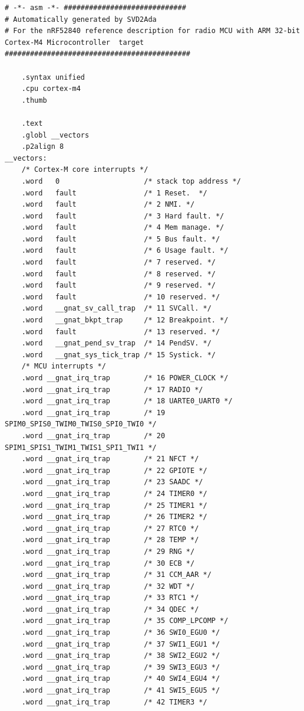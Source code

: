 \documentclass{article}
\begin{document}
\begin{lstlisting}
# -*- asm -*- #############################
# Automatically generated by SVD2Ada
# For the nRF52840 reference description for radio MCU with ARM 32-bit Cortex-M4 Microcontroller  target
############################################

	.syntax unified
	.cpu cortex-m4
	.thumb

	.text
	.globl __vectors
	.p2align 8
__vectors:
	/* Cortex-M core interrupts */
	.word   0                    /* stack top address */
	.word   fault                /* 1 Reset.  */
	.word   fault                /* 2 NMI. */
	.word   fault                /* 3 Hard fault. */
	.word   fault                /* 4 Mem manage. */
	.word   fault                /* 5 Bus fault. */
	.word   fault                /* 6 Usage fault. */
	.word   fault                /* 7 reserved. */
	.word   fault                /* 8 reserved. */
	.word   fault                /* 9 reserved. */
	.word   fault                /* 10 reserved. */
	.word   __gnat_sv_call_trap  /* 11 SVCall. */
	.word   __gnat_bkpt_trap     /* 12 Breakpoint. */
	.word   fault                /* 13 reserved. */
	.word   __gnat_pend_sv_trap  /* 14 PendSV. */
	.word   __gnat_sys_tick_trap /* 15 Systick. */
	/* MCU interrupts */
	.word __gnat_irq_trap        /* 16 POWER_CLOCK */
	.word __gnat_irq_trap        /* 17 RADIO */
	.word __gnat_irq_trap        /* 18 UARTE0_UART0 */
	.word __gnat_irq_trap        /* 19 SPIM0_SPIS0_TWIM0_TWIS0_SPI0_TWI0 */
	.word __gnat_irq_trap        /* 20 SPIM1_SPIS1_TWIM1_TWIS1_SPI1_TWI1 */
	.word __gnat_irq_trap        /* 21 NFCT */
	.word __gnat_irq_trap        /* 22 GPIOTE */
	.word __gnat_irq_trap        /* 23 SAADC */
	.word __gnat_irq_trap        /* 24 TIMER0 */
	.word __gnat_irq_trap        /* 25 TIMER1 */
	.word __gnat_irq_trap        /* 26 TIMER2 */
	.word __gnat_irq_trap        /* 27 RTC0 */
	.word __gnat_irq_trap        /* 28 TEMP */
	.word __gnat_irq_trap        /* 29 RNG */
	.word __gnat_irq_trap        /* 30 ECB */
	.word __gnat_irq_trap        /* 31 CCM_AAR */
	.word __gnat_irq_trap        /* 32 WDT */
	.word __gnat_irq_trap        /* 33 RTC1 */
	.word __gnat_irq_trap        /* 34 QDEC */
	.word __gnat_irq_trap        /* 35 COMP_LPCOMP */
	.word __gnat_irq_trap        /* 36 SWI0_EGU0 */
	.word __gnat_irq_trap        /* 37 SWI1_EGU1 */
	.word __gnat_irq_trap        /* 38 SWI2_EGU2 */
	.word __gnat_irq_trap        /* 39 SWI3_EGU3 */
	.word __gnat_irq_trap        /* 40 SWI4_EGU4 */
	.word __gnat_irq_trap        /* 41 SWI5_EGU5 */
	.word __gnat_irq_trap        /* 42 TIMER3 */

\end{lstlisting}
\end{document}
